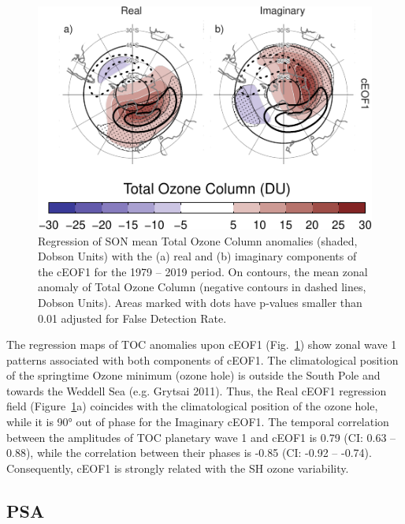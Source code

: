 \documentclass[smallextended]{svjour3}       %
\begin{document}
\begin{figure}
\centering
\includegraphics{../figures/o3-regr-1.pdf}
\caption{\label{fig:o3-regr}Regression of SON mean Total Ozone Column anomalies (shaded, Dobson Units) with the (a) real and (b) imaginary components of the cEOF1 for the 1979 -- 2019 period. On contours, the mean zonal anomaly of Total Ozone Column (negative contours in dashed lines, Dobson Units). Areas marked with dots have p-values smaller than 0.01 adjusted for False Detection Rate.}
\end{figure}



The regression maps of TOC anomalies upon cEOF1 (Fig.~\ref{fig:o3-regr}) show zonal wave 1 patterns associated with both components of cEOF1.
The climatological position of the springtime Ozone minimum (ozone hole) is outside the South Pole and towards the Weddell Sea (e.g. Grytsai 2011).
Thus, the Real cEOF1 regression field (Figure~\ref{fig:o3-regr}a) coincides with the climatological position of the ozone hole, while it is 90° out of phase for the Imaginary cEOF1.
The temporal correlation between the amplitudes of TOC planetary wave 1 and cEOF1 is 0.79 (CI: 0.63 -- 0.88), while the correlation between their phases is -0.85 (CI: -0.92 -- -0.74).
Consequently, cEOF1 is strongly related with the SH ozone variability.

\hypertarget{psa}{%
\subsection{PSA}\label{psa}}
\end{document}
